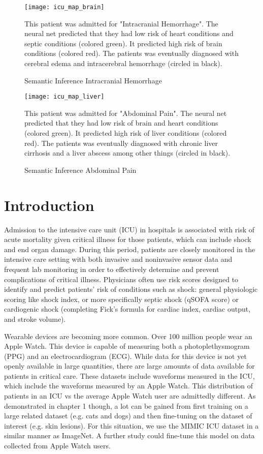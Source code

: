 \begin{figure}
\texttt{[image: icu\_map\_brain]}
\caption{Semantic Inference Intracranial Hemorrhage}
\vspace{12px}
This patient was admitted for "Intracranial Hemorrhage".  The neural net predicted that they had low risk of heart conditions and septic conditions (colored green).  It predicted high risk of brain conditions (colored red).  The patients was eventually diagnosed with cerebral edema and intracerebral hemorrhage (circled in black).
\label{fig:icu_map_brain}
\end{figure}

\begin{figure}
\texttt{[image: icu\_map\_liver]}
\caption{Semantic Inference Abdominal Pain}
\vspace{12px}
This patient was admitted for "Abdominal Pain".  The neural net predicted that they had low risk of brain and heart conditions (colored green).  It predicted high risk of liver conditions (colored red).  The patients was eventually diagnosed with chronic liver cirrhosis and a liver abscess among other things (circled in black).
\label{fig:icu_map_liver}
\end{figure}

\section{Introduction}
Admission to the intensive care unit (ICU) in hospitals is associated with risk of acute mortality given critical illness for those patients, which can include shock and end organ damage. During this period, patients are closely monitored in the intensive care setting with both invasive and noninvasive sensor data and frequent lab monitoring in order to effectively determine and prevent complications of critical illness.  Physicians often use risk scores designed to identify and predict patients’ risk of conditions such as shock: general physiologic scoring like shock index, or more specifically septic shock (qSOFA score) or cardiogenic shock (completing Fick’s formula for cardiac index, cardiac output, and stroke volume).

Wearable devices are becoming more common.  Over 100 million people wear an Apple Watch.  This device is capable of measuring both a photoplethysmogram (PPG) and an electrocardiogram (ECG).  While data for this device is not yet openly available in large quantities, there are large amounts of data available for patients in critical care.  These datasets include waveforms measured in the ICU, which include the waveforms measured by an Apple Watch.  This distribution of patients in an ICU vs the average Apple Watch user are admittedly different.  As demonstrated in chapter 1 though, a lot can be gained from first training on a large related dataset (e.g. cats and dogs) and then fine-tuning on the dataset of interest (e.g. skin lesions).  For this situation, we use the MIMIC ICU dataset in a similar manner as ImageNet.  A further study could fine-tune this model on data collected from Apple Watch users.

